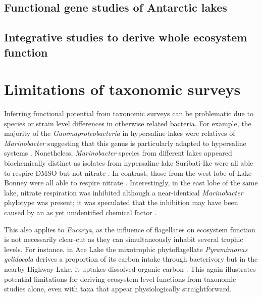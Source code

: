 \subsection{Functional gene studies of Antarctic lakes}

\subsection{Integrative studies to derive whole ecosystem function}


\section{Limitations of taxonomic surveys}
\label{in:pcrlimits}

Inferring functional potential from taxonomic surveys can be problematic due to species or strain level differences in otherwise related bacteria.
For example, the majority of the \emph{Gammaproteobacteria} in hypersaline lakes were relatives of \emph{Marinobacter} suggesting that this genus is particularly adapted to hypersaline systems
\cite{Bowman2000a, Glatz2006, Matsuzaki2006, Mosier2007}.
Nonetheless, \emph{Marinobacter} species from different lakes appeared biochemically distinct
 as isolates from hypersaline lake Suribati-Ike were all able to respire \ac{DMSO} but not nitrate \cite{Matsuzaki2006}. 
In contrast, those from the west lobe of Lake Bonney were all able to respire nitrate \cite{Ward1997}. 
Interestingly, in the east lobe of the same lake, nitrate respiration was inhibited although a near-identical \emph{Marinobacter} phylotype was present; 
it was speculated that the inhibition may have been caused by an as yet unidentified chemical factor \cite{Ward2005, Glatz2006}. 

This also applies to \emph{Eucarya}, as the influence of flagellates on ecosystem function is not necessarily clear-cut as they can simultaneously inhabit several trophic levels. 
For instance, in Ace Lake the mixotrophic phytoflagellate \emph{Pyramimonas gelidocola} derives a proportion of its carbon intake through bacterivory \cite{Bell2003} 
but in the nearby Highway Lake, it uptakes dissolved organic carbon \cite{Laybourn-Parry2005}. 
This again illustrates potential limitations for deriving ecosystem level functions from taxonomic studies alone, even with taxa that appear physiologically straightforward. 

